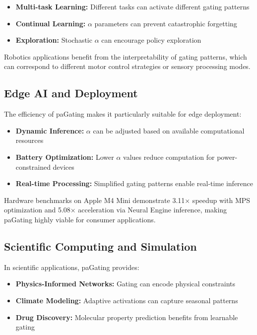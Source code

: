 \documentclass[lettersize,journal]{IEEEtran}
\begin{document}
\begin{itemize}
\item \textbf{Multi-task Learning:} Different tasks can activate different gating patterns
\item \textbf{Continual Learning:} $\alpha$ parameters can prevent catastrophic forgetting
\item \textbf{Exploration:} Stochastic $\alpha$ can encourage policy exploration
\end{itemize}

Robotics applications benefit from the interpretability of gating patterns, which can correspond to different motor control strategies or sensory processing modes.

\subsection{Edge AI and Deployment}
The efficiency of paGating makes it particularly suitable for edge deployment:

\begin{itemize}
\item \textbf{Dynamic Inference:} $\alpha$ can be adjusted based on available computational resources
\item \textbf{Battery Optimization:} Lower $\alpha$ values reduce computation for power-constrained devices
\item \textbf{Real-time Processing:} Simplified gating patterns enable real-time inference
\end{itemize}

Hardware benchmarks on Apple M4 Mini demonstrate 3.11× speedup with MPS optimization and 5.08× acceleration via Neural Engine inference, making paGating highly viable for consumer applications.

\subsection{Scientific Computing and Simulation}
In scientific applications, paGating provides:

\begin{itemize}
\item \textbf{Physics-Informed Networks:} Gating can encode physical constraints
\item \textbf{Climate Modeling:} Adaptive activations can capture seasonal patterns
\item \textbf{Drug Discovery:} Molecular property prediction benefits from learnable gating
\end{itemize}
\end{document}
